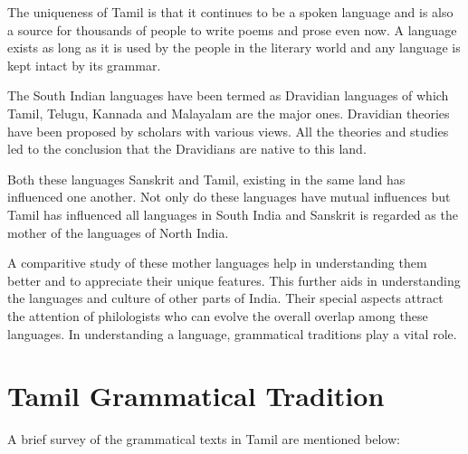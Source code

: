The uniqueness of Tamil is that it continues to be a spoken language and is also a source for thousands of people to write poems and prose even now. A language exists as long as it is used by the people in the literary world and any language is kept intact by its grammar.

The South Indian languages have been termed as Dravidian languages of which Tamil, Telugu, Kannada and Malayalam are the major ones. Dravidian theories have been proposed by scholars with various views. All the theories and studies led to the conclusion that the Dravidians are native to this land.

Both these languages Sanskrit and Tamil, existing in the same land has influenced one another. Not only do these languages have mutual influences but Tamil has influenced all languages in South India and Sanskrit is regarded as the mother of the languages of North India.

A comparitive study of these mother languages help in understanding them better and to appreciate their unique features. This further aids in understanding the languages and culture of other parts of India. Their special aspects attract the attention of philologists who can evolve the overall overlap among these languages. In understanding a language, grammatical traditions play a vital role.


\section*{Tamil Grammatical Tradition}

A brief survey of the grammatical texts in Tamil are mentioned below:

